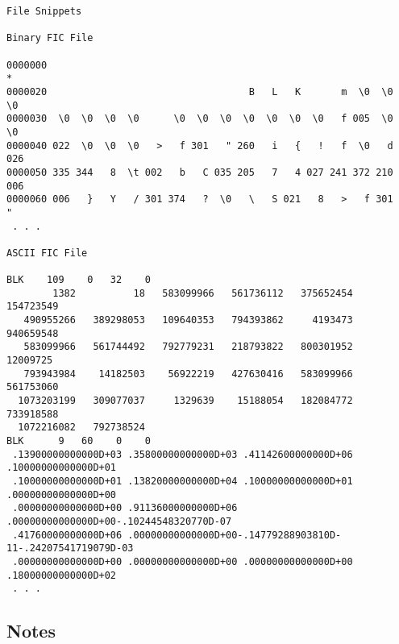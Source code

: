 \begin{\outputsize}
\begin{verbatim}
File Snippets

Binary FIC File

0000000
*
0000020                                   B   L   K       m  \0  \0  \0
0000030  \0  \0  \0  \0      \0  \0  \0  \0  \0  \0  \0   f 005  \0  \0
0000040 022  \0  \0  \0   >   f 301   " 260   i   {   !   f  \0   d 026
0000050 335 344   8  \t 002   b   C 035 205   7   4 027 241 372 210 006
0000060 006   }   Y   / 301 374   ?  \0   \   S 021   8   >   f 301   "
 . . .

ASCII FIC File

BLK    109    0   32    0
        1382          18   583099966   561736112   375652454   154723549
   490955266   389298053   109640353   794393862     4193473   940659548
   583099966   561744492   792779231   218793822   800301952    12009725
   793943984    14182503    56922219   427630416   583099966   561753060
  1073203199   309077037     1329639    15188054   182084772   733918588
  1072216082   792738524
BLK      9   60    0    0
 .13900000000000D+03 .35800000000000D+03 .41142600000000D+06 .10000000000000D+01
 .10000000000000D+01 .13820000000000D+04 .10000000000000D+01 .00000000000000D+00
 .00000000000000D+00 .91136000000000D+06 .00000000000000D+00-.10244548320770D-07
 .41760000000000D+06 .00000000000000D+00-.14779288903810D-11-.24207541719079D-03
 .00000000000000D+00 .00000000000000D+00 .00000000000000D+00 .18000000000000D+02
 . . .
\end{verbatim}
\end{\outputsize}

\subsection{Notes}

%

